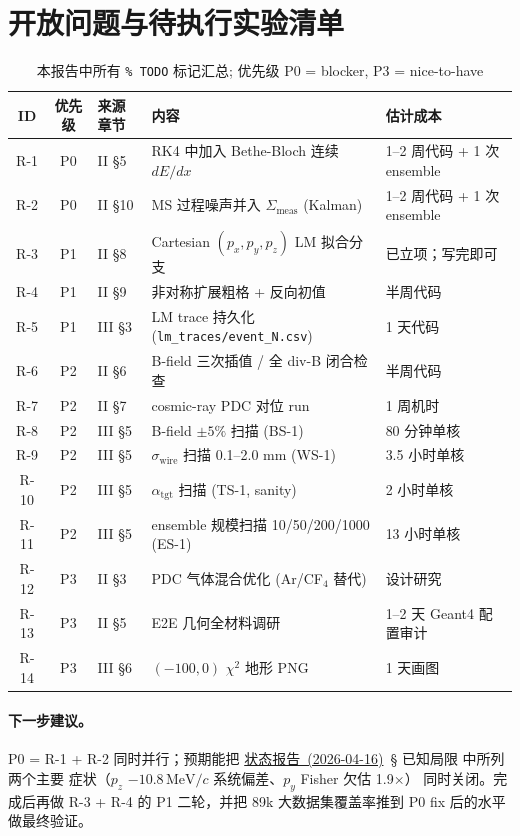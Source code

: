 \documentclass[a4paper, 11pt]{article}
\theoremstyle{plain}
\theoremstyle{definition}
\theoremstyle{remark}
\providecommand{\StatusReport}{\href{rk_reconstruction_status_20260416_zh.pdf}{状态报告~(2026-04-16)}}
\begin{document}
\section{开放问题与待执行实验清单}
\label{app:open}

\begin{table}[H]
\centering\footnotesize
\caption{本报告中所有 \texttt{\% TODO} 标记汇总; 优先级 P0 = blocker, P3 = nice-to-have}
\label{tab:todos}
\begin{tabular}{cclll}
\toprule
ID & 优先级 & 来源章节 & 内容 & 估计成本 \\
\midrule
R-1 & P0 & II §5  & RK4 中加入 Bethe-Bloch 连续 $dE/dx$
                  & 1--2 周代码 + 1 次 ensemble \\
R-2 & P0 & II §10 & MS 过程噪声并入 $\Sigma_\mathrm{meas}$ (Kalman)
                  & 1--2 周代码 + 1 次 ensemble \\
R-3 & P1 & II §8  & Cartesian $(p_x,p_y,p_z)$ LM 拟合分支
                  & 已立项；写完即可 \\
R-4 & P1 & II §9  & 非对称扩展粗格 + 反向初值
                  & 半周代码 \\
R-5 & P1 & III §3 & LM trace 持久化 (\texttt{lm\_traces/event\_N.csv})
                  & 1 天代码 \\
R-6 & P2 & II §6  & B-field 三次插值 / 全 div-B 闭合检查
                  & 半周代码 \\
R-7 & P2 & II §7  & cosmic-ray PDC 对位 run
                  & 1 周机时 \\
R-8 & P2 & III §5 & B-field $\pm 5\%$ 扫描 (BS-1)
                  & 80 分钟单核 \\
R-9 & P2 & III §5 & $\sigma_\mathrm{wire}$ 扫描 0.1--2.0 mm (WS-1)
                  & 3.5 小时单核 \\
R-10 & P2 & III §5 & $\alpha_\mathrm{tgt}$ 扫描 (TS-1, sanity)
                  & 2 小时单核 \\
R-11 & P2 & III §5 & ensemble 规模扫描 10/50/200/1000 (ES-1)
                  & 13 小时单核 \\
R-12 & P3 & II §3  & PDC 气体混合优化 (Ar/CF$_4$ 替代)
                  & 设计研究 \\
R-13 & P3 & II §5  & E2E 几何全材料调研
                  & 1--2 天 Geant4 配置审计 \\
R-14 & P3 & III §6 & $(-100,0)$ $\chi^2$ 地形 PNG
                  & 1 天画图 \\
\bottomrule
\end{tabular}
\end{table}

\paragraph{下一步建议。}
P0 = R-1 + R-2 同时并行；预期能把 \StatusReport\ § 已知局限 中所列两个主要
症状（$p_z$ $-10.8\,\mathrm{MeV}/c$ 系统偏差、$p_y$ Fisher 欠估 1.9$\times$）
同时关闭。完成后再做 R-3 + R-4 的 P1 二轮，并把 89k 大数据集覆盖率推到 P0
fix 后的水平做最终验证。

\end{document}
